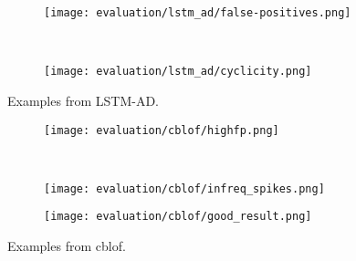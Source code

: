 \begin{figure}[htp!]
    \begin{subfigure}[b]{\linewidth}
        \centering
        \texttt{[image: evaluation/lstm\_ad/false-positives.png]}
        \label{fig:lstmad-fp}
    \end{subfigure}%
    \\
    \begin{subfigure}[b]{\linewidth}
        \centering
        \texttt{[image: evaluation/lstm\_ad/cyclicity.png]}
        \label{fig:lstmad-cyclicity}
    \end{subfigure}
    \caption{Examples from LSTM-AD.}\label{fig:lstmad-output}
\end{figure}

\begin{figure}[htp!]
    \begin{subfigure}[b]{\linewidth}
        \centering
        \texttt{[image: evaluation/cblof/highfp.png]}
        \label{fig:cblof-fp}
    \end{subfigure}%
    \\
    \begin{subfigure}[b]{\linewidth}
        \centering
        \texttt{[image: evaluation/cblof/infreq\_spikes.png]}
        \label{fig:cblof-cyclicity}
    \end{subfigure}
\end{figure}

\begin{figure}[htp!]
    \ContinuedFloat{}
    \begin{subfigure}[b]{\linewidth}
        \centering
        \texttt{[image: evaluation/cblof/good\_result.png]}
        \label{fig:cblof-good}
    \end{subfigure}
\caption{Examples from \gls{cblof}.}\label{fig:cblof-output}
\end{figure}


